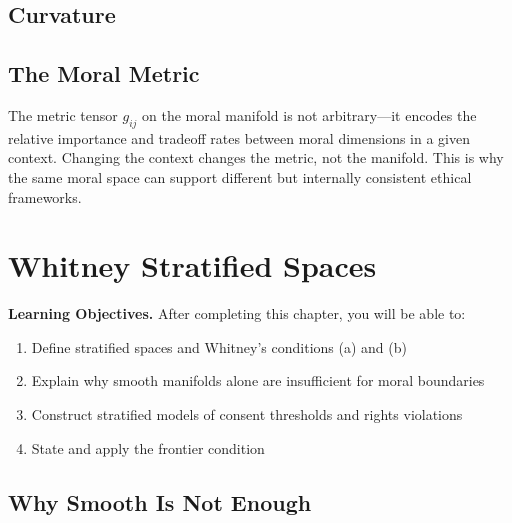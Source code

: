 \documentclass[12pt,letterpaper,twoside,openright]{book}
\theoremstyle{plain}
\theoremstyle{definition}
\theoremstyle{remark}
\begin{document}
\section{Curvature}

\section{The Moral Metric}

\begin{keyinsight}
The metric tensor $g_{ij}$ on the moral manifold is not arbitrary---it encodes the relative importance and tradeoff rates between moral dimensions in a given context. Changing the context changes the metric, not the manifold. This is why the same moral space can support different but internally consistent ethical frameworks.
\end{keyinsight}


\chapter{Whitney Stratified Spaces}
\label{ch:stratification}

\begin{framed}
\noindent\textbf{Learning Objectives.} After completing this chapter, you will be able to:
\begin{enumerate}
    \item Define stratified spaces and Whitney's conditions (a) and (b)
    \item Explain why smooth manifolds alone are insufficient for moral boundaries
    \item Construct stratified models of consent thresholds and rights violations
    \item State and apply the frontier condition
\end{enumerate}
\end{framed}

\section{Why Smooth Is Not Enough}
\end{document}
